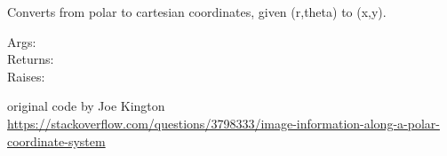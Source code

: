 \documentclass[a4paper,10pt,english]{sphinxmanual}
\begin{document}
\begin{fulllineitems}
\label{ryutils:pyradi.ryutils.polar2cart}
Converts from polar to cartesian coordinates, given (r,theta) to (x,y).
\begin{description}
\item[{Args:}] \leavevmode
{}

\item[{Returns:}] \leavevmode
{}

\item[{Raises:}] \leavevmode
{}

\end{description}

original code by Joe Kington
\href{https://stackoverflow.com/questions/3798333/image-information-along-a-polar-coordinate-system}{https://stackoverflow.com/questions/3798333/image-information-along-a-polar-coordinate-system}

\end{fulllineitems}

\end{document}
